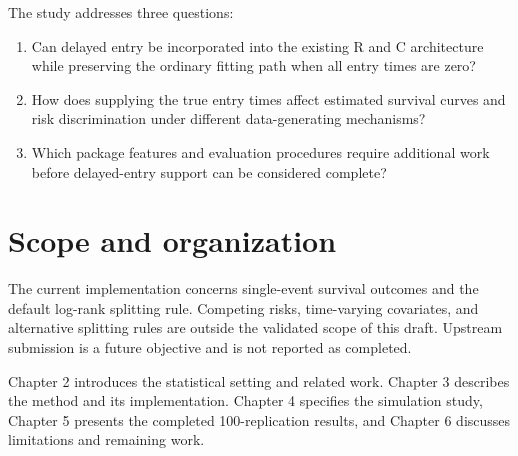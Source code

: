 The study addresses three questions:
\begin{enumerate}
\item Can delayed entry be incorporated into the existing R and C architecture
while preserving the ordinary fitting path when all entry times are zero?
\item How does supplying the true entry times affect estimated survival curves
and risk discrimination under different data-generating mechanisms?
\item Which package features and evaluation procedures require additional work
before delayed-entry support can be considered complete?
\end{enumerate}

\section{Scope and organization}
The current implementation concerns single-event survival outcomes and the
default log-rank splitting rule. Competing risks, time-varying covariates, and
alternative splitting rules are outside the validated scope of this draft.
Upstream submission is a future objective and is not reported as completed.

Chapter 2 introduces the statistical setting and related work. Chapter 3
describes the method and its implementation. Chapter 4 specifies the simulation
study, Chapter 5 presents the completed 100-replication results, and Chapter 6 discusses
limitations and remaining work.

